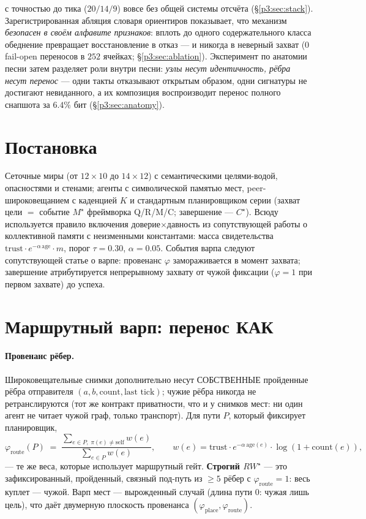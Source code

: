 \documentclass{article}
\newcommand{\rwstar}{RW^{\star}}
\newcommand{\mstar}{M^{\star}}
\newcommand{\cstar}{C^{\star}}
\newcommand{\phiroute}{\varphi_{\mathrm{route}}}
\begin{document}
\begin{enumerate}[leftmargin=20pt,itemsep=2pt,topsep=2pt]
  с точностью до тика ($20/14/9$) вовсе без общей системы отсчёта
  (\S\ref{p3:sec:stack}). Зарегистрированная абляция словаря ориентиров
  показывает, что механизм \emph{безопасен в своём алфавите
  признаков}: вплоть до одного содержательного класса обеднение
  превращает восстановление в отказ --- и никогда в неверный захват
  ($0$ fail-open переносов в $252$ ячейках; \S\ref{p3:sec:ablation}).
  Эксперимент по анатомии песни затем разделяет роли внутри песни:
  \emph{узлы несут идентичность, рёбра несут перенос} --- одни такты
  отказывают открытым образом, одни сигнатуры не достигают
  невиданного, а их композиция воспроизводит перенос полного снапшота
  за $6.4\%$ бит (\S\ref{p3:sec:anatomy}).
\end{enumerate}

\section{Постановка}
\label{p3:sec:setting}

Сеточные миры (от $12{\times}10$ до $14{\times}12$) с семантическими
целями-водой, опасностями и стенами; агенты с символической памятью
мест, peer-широковещанием с каденцией $K$ и стандартным планировщиком
серии (захват цели $=$ событие $\mstar$ фреймворка Q/R/M/C; завершение
--- $\cstar$). Всюду используется правило включения
доверие$\times$давность из сопутствующей работы о коллективной памяти
с неизменными константами: масса свидетельства
$\text{trust}\cdot e^{-\alpha\,\text{age}}\cdot m$, порог
$\tau{=}0.30$, $\alpha{=}0.05$. События варпа следуют сопутствующей
статье о варпе: провенанс $\varphi$ замораживается в момент захвата;
завершение атрибутируется непрерывному захвату от чужой фиксации
($\varphi{=}1$ при первом захвате) до успеха.

\section{Маршрутный варп: перенос КАК}
\label{p3:sec:route}

\paragraph{Провенанс рёбер.} Широковещательные снимки дополнительно
несут СОБСТВЕННЫЕ пройденные рёбра отправителя
$(a,b,\text{count},\text{last tick})$; чужие рёбра никогда не
ретранслируются (тот же контракт приватности, что и у снимков мест: ни
один агент не читает чужой граф, только транспорт). Для пути $P$,
который фиксирует планировщик,
\[
\phiroute(P) \;=\;
\frac{\sum_{e\in P,\;\pi(e)\neq\mathrm{self}} w(e)}
     {\sum_{e\in P} w(e)},
\qquad w(e) = \text{trust}\cdot e^{-\alpha\,\text{age}(e)}\cdot
\log(1{+}\text{count}(e)),
\]
--- те же веса, которые использует маршрутный гейт. \textbf{Строгий
$\rwstar$} --- это зафиксированный, пройденный, связный под-путь из
$\ge 5$ рёбер с $\phiroute = 1$: весь куплет --- чужой. Варп мест ---
вырожденный случай (длина пути $0$: чужая лишь цель), что даёт
двумерную плоскость провенанса $(\varphi_{\mathrm{place}},
\phiroute)$.
\end{document}
